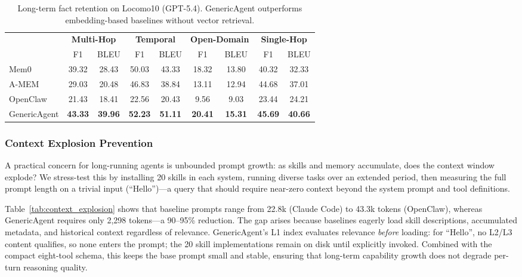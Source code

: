 \begin{table}[t]
\centering
\caption{Long-term fact retention on Locomo10 (GPT-5.4). GenericAgent outperforms embedding-based baselines without vector retrieval.}
\label{tab:long_term_memory}
\begin{tabular}{lcccccccc}
\toprule
& \multicolumn{2}{c}{\textbf{Multi-Hop}} & \multicolumn{2}{c}{\textbf{Temporal}} & \multicolumn{2}{c}{\textbf{Open-Domain}} & \multicolumn{2}{c}{\textbf{Single-Hop}} \\
\cmidrule(lr){2-3} \cmidrule(lr){4-5} \cmidrule(lr){6-7} \cmidrule(lr){8-9}
& F1 & BLEU & F1 & BLEU & F1 & BLEU & F1 & BLEU \\
\midrule
Mem0         & 39.32 & 28.43 & 50.03 & 43.33 & 18.32 & 13.80 & 40.32 & 32.33 \\
A-MEM        & 29.03 & 20.48 & 46.83 & 38.84 & 13.11 & 12.94 & 44.68 & 37.01 \\
OpenClaw     & 21.43 & 18.41 & 22.56 & 20.43 &  9.56 &  9.03 & 23.44 & 24.21 \\
GenericAgent & \textbf{43.33} & \textbf{39.96} & \textbf{52.23} & \textbf{51.11} & \textbf{20.41} & \textbf{15.31} & \textbf{45.69} & \textbf{40.66} \\
\bottomrule
\end{tabular}
\end{table}


\subsubsection{Context Explosion Prevention}
\label{sec:exp_mem_explosion}

A practical concern for long-running agents is unbounded prompt growth: as skills and memory accumulate, does the context window explode?
We stress-test this by installing 20 skills in each system, running diverse tasks over an extended period, then measuring the full prompt length on a trivial input (``Hello'')---a query that should require near-zero context beyond the system prompt and tool definitions.

Table~\ref{tab:context_explosion} shows that baseline prompts range from 22.8k (Claude Code) to 43.3k tokens (OpenClaw), whereas GenericAgent requires only 2,298 tokens---a 90--95\% reduction.
The gap arises because baselines eagerly load skill descriptions, accumulated metadata, and historical context regardless of relevance.
GenericAgent's L1 index evaluates relevance \emph{before} loading: for ``Hello'', no L2/L3 content qualifies, so none enters the prompt; the 20 skill implementations remain on disk until explicitly invoked.
Combined with the compact eight-tool schema, this keeps the base prompt small and stable, ensuring that long-term capability growth does not degrade per-turn reasoning quality.

